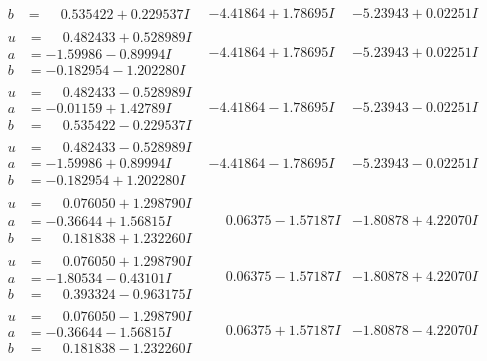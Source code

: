 \documentclass[1p]{elsarticle_modified}
\theoremstyle{definition}
\begin{document}
$$\begin{array}{c|c|c}
\begin{aligned}
b &= \phantom{-}0.535422 + 0.229537 I\end{aligned}
 & -4.41864 + 1.78695 I & -5.23943 + 0.02251 I \\ \hline\begin{aligned}
u &= \phantom{-}0.482433 + 0.528989 I \\
a &= -1.59986 - 0.89994 I \\
b &= -0.182954 - 1.202280 I\end{aligned}
 & -4.41864 + 1.78695 I & -5.23943 + 0.02251 I \\ \hline\begin{aligned}
u &= \phantom{-}0.482433 - 0.528989 I \\
a &= -0.01159 + 1.42789 I \\
b &= \phantom{-}0.535422 - 0.229537 I\end{aligned}
 & -4.41864 - 1.78695 I & -5.23943 - 0.02251 I \\ \hline\begin{aligned}
u &= \phantom{-}0.482433 - 0.528989 I \\
a &= -1.59986 + 0.89994 I \\
b &= -0.182954 + 1.202280 I\end{aligned}
 & -4.41864 - 1.78695 I & -5.23943 - 0.02251 I \\ \hline\begin{aligned}
u &= \phantom{-}0.076050 + 1.298790 I \\
a &= -0.36644 + 1.56815 I \\
b &= \phantom{-}0.181838 + 1.232260 I\end{aligned}
 & \phantom{-}0.06375 - 1.57187 I & -1.80878 + 4.22070 I \\ \hline\begin{aligned}
u &= \phantom{-}0.076050 + 1.298790 I \\
a &= -1.80534 - 0.43101 I \\
b &= \phantom{-}0.393324 - 0.963175 I\end{aligned}
 & \phantom{-}0.06375 - 1.57187 I & -1.80878 + 4.22070 I \\ \hline\begin{aligned}
u &= \phantom{-}0.076050 - 1.298790 I \\
a &= -0.36644 - 1.56815 I \\
b &= \phantom{-}0.181838 - 1.232260 I\end{aligned}
 & \phantom{-}0.06375 + 1.57187 I & -1.80878 - 4.22070 I \\ \hline\begin{aligned}

\end{aligned}
\end{array}$$
\end{document}

